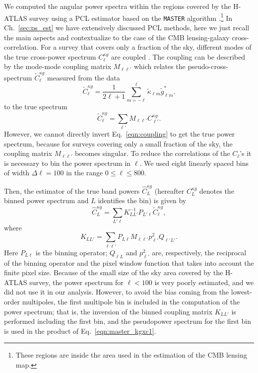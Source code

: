 We computed the angular power spectra within the regions covered by the H-ATLAS survey using a \gls{PCL} estimator based on the \texttt{MASTER} algorithm \citep{Hivon2001a}.\footnote{These regions are inside the area used in the estimation of the \gls{CMB} lensing map.}  In Ch.~\eqref{sec:ps_est} we have extensively discussed \gls{PCL} methods, here we just recall the main aspects and contextualize to the case of the \gls{CMB} lensing-galaxy cross-correlation. For a survey that covers only a fraction of the sky, different modes of the true cross-power spectrum $C^{\kappa g}_{\ell}$ are coupled \citep{Hauser1973}. The coupling can be described by the mode-mode coupling matrix $M_{\ell\ell'}$ which relates the pseudo-cross-spectrum $\tilde{C}^{\kappa g}_{\ell}$ measured from the data
%
\begin{equation}
\tilde{C}^{\kappa g}_{\ell} = \frac{1}{2\ell+1}\sum_{m=-\ell}^{\ell} \tilde{\kappa}_{\ell m}\tilde{g}^*_{\ell m}.
\end{equation}
%
to the true spectrum
%
\begin{equation}
\label{eqn:coupling}
\tilde{C}_{\ell}^{\kappa g} = \sum_{\ell'} M_{\ell\ell'}C_{\ell'}^{\kappa g}.
\end{equation}
%
However, we cannot directly invert Eq.~\eqref{eqn:coupling} to get the true power spectrum, because for surveys covering only a small fraction of the sky, the coupling matrix $M_{\ell\ell'}$ becomes singular.  To reduce the correlations of the $C_{\ell}$'s it is necessary to bin the power spectrum in $\ell$. We used eight linearly spaced bins of width $\Delta\ell = 100$ in the range $0 \le \ell \le 800$.

Then, the estimator of the true band powers $\hat{C}^{\kappa g}_{L}$ (hereafter $C^{\kappa g}_{L}$ denotes the binned power spectrum and  $L$ identifies the bin) is given by
%
\begin{equation}
\label{eqn:master_kgxc1}
\hat{C}^{\kappa g}_{L} = \sum_{L' \ell}K^{-1}_{LL'}P_{L'\ell}\tilde{C}^{\kappa g}_{\ell},
\end{equation}
%
where
%
\begin{equation}
K_{LL'} = \sum_{\ell\ell'} P_{L\ell}M_{\ell\ell'}p^2_{\ell'}Q_{\ell' L'}.
\end{equation}
%
Here $P_{L\ell}$ is the binning operator; $Q_{\ell L}$ and $p^2_{\ell'}$ are, respectively, the reciprocal of the binning operator and  the pixel window function that takes into account the finite pixel size. Because of the small size of the sky area covered by the H-ATLAS survey, the power spectrum for $\ell < 100$ is very poorly estimated, and we did not use it in our analysis. However, to avoid the bias coming from the lowest-order multipoles, the first multipole bin is included in the computation of the power spectrum; that is, the inversion of the binned coupling matrix $K_{LL'}$ is performed including the first bin, and the pseudopower spectrum for the first bin is used in the product of Eq.~\eqref{eqn:master_kgxc1}.

